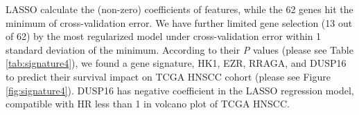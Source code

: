 \documentclass[preprint,12pt]{elsarticle}
\newenvironment{MyColorPar}[1]{%
    \leavevmode\color{#1}\ignorespaces%
}{%
}%
\begin{document}
\begin{MyColorPar}{blue}

LASSO calculate the (non-zero) coefficients of features, while the 62 genes hit the minimum of cross-validation error.
We have further limited gene selection (13 out of 62) by the most regularized model under cross-validation error within 1 standard deviation of the minimum.
According to their \textit{P} values (please see Table \ref{tab:signature4}), 
we found a gene signature, HK1, EZR, RRAGA, and DUSP16 to predict their survival impact on TCGA HNSCC cohort (please see Figure \ref{fig:signature4}).
DUSP16 has negative coefficient in the LASSO regression model, compatible with HR less than 1 in volcano plot of TCGA HNSCC.



\end{MyColorPar}
\end{document}
